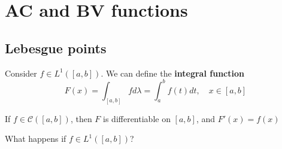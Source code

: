 
\section{AC and BV functions}
\subsection{Lebesgue points}
Consider \(f \in L^1\left([a,b]\right)\). We can define the \textbf{integral function}
\[F(x) = \int_{[a,b]} f d\lambda = \int_a^b f(t)dt , \quad x \in [a,b]\]

If \(f \in \mathcal{C}\left(\left[a, b\right]\right)\), then \(F\) is differentiable on \(\left[a, b\right]\), and \(F'(x)=f(x)\)

What happens if \(f \in L^1([a, b])\)?



